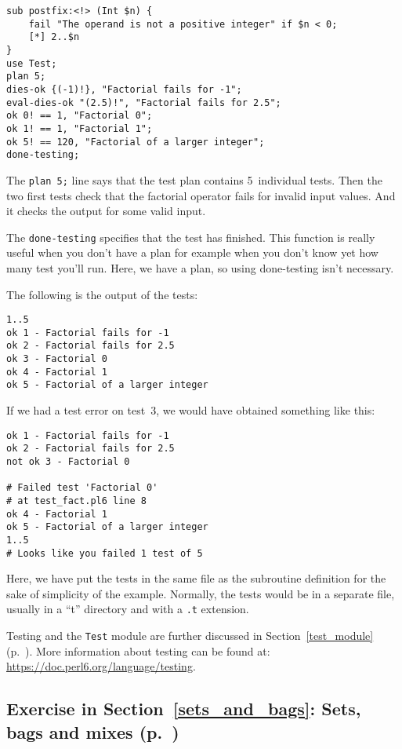 \begin{verbatim}
sub postfix:<!> (Int $n) {
    fail "The operand is not a positive integer" if $n < 0;
    [*] 2..$n
}
use Test;
plan 5;
dies-ok {(-1)!}, "Factorial fails for -1";
eval-dies-ok "(2.5)!", "Factorial fails for 2.5";
ok 0! == 1, "Factorial 0";
ok 1! == 1, "Factorial 1";
ok 5! == 120, "Factorial of a larger integer";
done-testing;
\end{verbatim}

The {\tt plan 5;} line says that the test plan contains 
5~individual tests. Then the two first tests check that 
the factorial operator fails for invalid input values. And 
it checks the output for some valid input.

The {\tt done-testing} specifies that the test has finished. 
This function is really useful when you don't have a plan 
for example when you don't know yet how many test you'll run. 
Here, we have a plan, so using done-testing isn't necessary.

The following is the output of the tests:

\begin{verbatim}
1..5
ok 1 - Factorial fails for -1
ok 2 - Factorial fails for 2.5
ok 3 - Factorial 0
ok 4 - Factorial 1
ok 5 - Factorial of a larger integer
\end{verbatim}

If we had a test error on test~3, we would have obtained 
something like this:

\begin{verbatim}
ok 1 - Factorial fails for -1
ok 2 - Factorial fails for 2.5
not ok 3 - Factorial 0

# Failed test 'Factorial 0'
# at test_fact.pl6 line 8
ok 4 - Factorial 1
ok 5 - Factorial of a larger integer
1..5
# Looks like you failed 1 test of 5
\end{verbatim}

Here, we have put the tests in the same file as the subroutine 
definition for the sake of simplicity of the example. Normally, 
the tests would be in a separate file, usually in a ``t'' 
directory and with a \verb'.t' extension.

Testing and the {\tt Test} module are further discussed  
in Section~\ref{test_module} (p.~\pageref{test_module}).
More information about testing can be found at: 
\url{https://doc.perl6.org/language/testing}.

\subsection{Exercise in Section~\ref{sets_and_bags}: Sets, bags and mixes (p.~\pageref{diff_with_set})}
\label{sol_diff_with_set}

